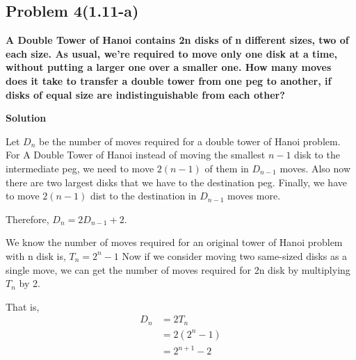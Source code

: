 \subsection{Problem 4(1.11-a)}
\textbf{A Double Tower of Hanoi contains 2n disks of n different sizes, two of
each size. As usual, we're required to move only one disk at a time,
without putting a larger one over a smaller one. How many moves does it take to transfer a double tower from one peg to another, if disks of equal size are indistinguishable from each
other?}
\par

\begin{flushleft}
\textbf{Solution}
\par
Let $D_n$ be the number of moves required for a double tower of Hanoi problem.
For A Double Tower of Hanoi instead of moving the smallest $n-1$ disk to the intermediate peg, we need to move $2(n-1)$ of them in $D_{n-1}$ moves. Also now there are two largest disks that we have to the destination peg. Finally, we have to move $2(n-1)$ dist to the destination in $D_{n-1}$ moves more.\par
Therefore, $D_n = 2D_{n-1}+2$.
\par
We know the number of moves required for an original tower of Hanoi problem with n disk is, $T_n = 2^n-1$
Now if we consider moving two same-sized disks as a single move, we can get the number of moves required for 2n disk by multiplying $T_n$ by 2.
\par 
That is, 
$$
\begin{aligned}
D_n & = 2T_n\\
&   = 2(2^n-1)\\
&   = 2^{n+1} - 2
\end{aligned}
$$

\end{flushleft}